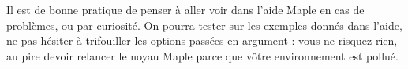 \documentclass[10pt,a4paper]{article}
\begin{document}
 Il est de bonne pratique de penser à aller voir dans l'aide Maple en cas de problèmes, ou par curiosité. On pourra tester sur les exemples donnés dans l'aide, ne pas hésiter à trifouiller les options passées en argument : vous ne risquez rien, au pire devoir relancer le noyau Maple parce que vôtre environnement est pollué.

% 
%
%
%
%
%
\end{document}
